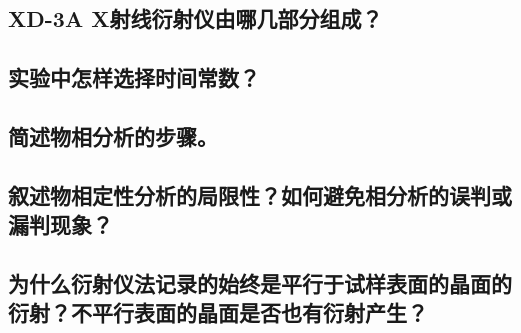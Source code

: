 \documentclass[a4paper]{article}
\begin{document}
\subsection*{XD-3A X射线衍射仪由哪几部分组成？}
\subsection*{实验中怎样选择时间常数？}
\subsection*{简述物相分析的步骤。}
\subsection*{叙述物相定性分析的局限性？如何避免相分析的误判或漏判现象？}
\subsection*{为什么衍射仪法记录的始终是平行于试样表面的晶面的衍射？不平行表面的晶面是否也有衍射产生？}

\nocite{jiaocai}

\end{document}
